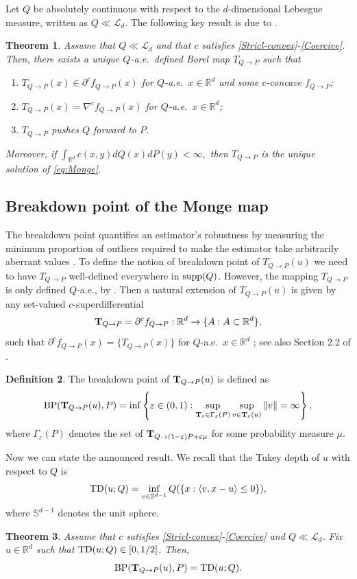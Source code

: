 \documentclass[11pt]{article}
\newcommand{\RR}{\mathbb{R}}
\newcommand{\R}{\RR}
\newcommand{\eps}{ \varepsilon}
\theoremstyle{plain}
\newtheorem{theorem}{Theorem}[section]
\theoremstyle{definition}\newtheorem{definition}[theorem]{Definition}
\theoremstyle{remark}
\begin{document}
Let $Q$ be absolutely continuous with respect to the $d$-dimensional Lebesgue measure, written as  $Q \ll \mathcal{L}_d$. The following  key result is due to \cite{GangboMcCann.96}. 

\begin{theorem}\label{Theorem-Gangbo-McCann}\cite[Theorems 3.7 and 4.5]{GangboMcCann.96}
    Assume that $Q\ll \mathcal{L}_d$ and that $c$ satisfies \ref{Stricl-convex}-\ref{Coercive}. Then,  there exists a unique $Q$-a.e.~defined Borel map $T_{Q\to P}$ such that 
\begin{enumerate}
    \item $T_{Q\to P}(x) \in \partial^c f_{Q\to P}(x)$  for $Q$-a.e.~$x\in \R^d$ and some $c$-concave $f_{Q\to P}$; 
    \item $T_{Q\to P}(x)=\nabla^c f_{Q\to P}(x) $ for $Q$-a.e.~$x\in \R^d$; 
    \item $ T_{Q\to P}$ pushes $Q$ forward to $P$. 
\end{enumerate} 
Moreover, if $\int_{\mathbb{R}^d} c({x},y)   dQ(x) d P (y)<\infty, $ then $T_{Q\to P}$ is the unique solution of \eqref{eq:Monge}.
\end{theorem}


%
\subsection{Breakdown point of the Monge map}
The breakdown point quantifies an estimator's robustness by measuring the minimum proportion of outliers required to make the estimator take arbitrarily aberrant values \citep{huber:ronchetti2009}.  
To define the notion of breakdown point of $ T_{Q\to P}(u)$ we need to have  $ T_{Q\to P}$  well-defined everywhere in ${\rm supp}(Q)$. However, the mapping  $ T_{Q\to P}$ is only defined $Q$-a.e., by . Then a natural extension of $ T_{Q\to P}(u)$ is given by any set-valued $c$-superdifferential   $$ {\bf T}_{Q\to P}=\partial^c f_{Q\to P}: \R^d\to \{A: A\subset \R^d\},$$
such that $\partial^c f_{Q\to P}(x)= \{ {T}_{Q\to P}(x)\}$ for $Q$-a.e.~$x\in \R^d$ %
;   see also Section 2.2 of  \cite{Avella-Gonzalez.25}. 
%
\begin{definition}
    The breakdown point of ${\bf T}_{Q\to P}(u)$  is defined as 
  $${\rm BP}({\bf T}_{Q\to P}(u), P)= \inf \left\{ \varepsilon\in (0,1): \sup_{{\bf T}_\varepsilon\in \Gamma_\varepsilon(P)} \sup_{v\in {\bf T}_\varepsilon (u)} \|v\| = \infty\right \},$$
where $\Gamma_\eps(P)$ denotes the set of ${\bf T}_{Q\to (1-\eps )P+\eps \mu}$ for some probability measure $\mu$. 
\end{definition}
 Now we can state the announced result. We recall that the Tukey depth \citep{Tukey.1975} of $u$ with respect to $Q$ is
$$ {\rm TD}(u;Q)=\inf_{v\in \mathbb{S}^{d-1}} Q(\{ x: \langle v, x-u\rangle \leq 0\}), $$
where $\mathbb{S}^{d-1}$ denotes the unit sphere. 
\begin{theorem}\label{theo:Breakdown}
Assume that $c$ satisfies \ref{Stricl-convex}-\ref{Coercive} and $Q \ll \mathcal{L}_d$. Fix   $u\in \R^d$  such that ${\rm TD}(u;Q)\in [0,1/2]$.     Then, 
   $$ {\rm BP}({\bf T}_{Q\to P}(u), P) = 
{\rm TD}(u;Q).$$ 
\end{theorem} 
\end{document}
